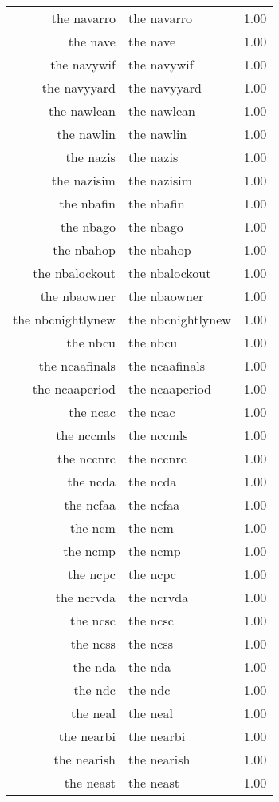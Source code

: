 \begin{table}[ht]
\begin{tabular}{rlr}
  the navarro & the navarro & 1.00 \\ 
  the nave & the nave & 1.00 \\ 
  the navywif & the navywif & 1.00 \\ 
  the navyyard & the navyyard & 1.00 \\ 
  the nawlean & the nawlean & 1.00 \\ 
  the nawlin & the nawlin & 1.00 \\ 
  the nazis & the nazis & 1.00 \\ 
  the nazisim & the nazisim & 1.00 \\ 
  the nbafin & the nbafin & 1.00 \\ 
  the nbago & the nbago & 1.00 \\ 
  the nbahop & the nbahop & 1.00 \\ 
  the nbalockout & the nbalockout & 1.00 \\ 
  the nbaowner & the nbaowner & 1.00 \\ 
  the nbcnightlynew & the nbcnightlynew & 1.00 \\ 
  the nbcu & the nbcu & 1.00 \\ 
  the ncaafinals & the ncaafinals & 1.00 \\ 
  the ncaaperiod & the ncaaperiod & 1.00 \\ 
  the ncac & the ncac & 1.00 \\ 
  the nccmls & the nccmls & 1.00 \\ 
  the nccnrc & the nccnrc & 1.00 \\ 
  the ncda & the ncda & 1.00 \\ 
  the ncfaa & the ncfaa & 1.00 \\ 
  the ncm & the ncm & 1.00 \\ 
  the ncmp & the ncmp & 1.00 \\ 
  the ncpc & the ncpc & 1.00 \\ 
  the ncrvda & the ncrvda & 1.00 \\ 
  the ncsc & the ncsc & 1.00 \\ 
  the ncss & the ncss & 1.00 \\ 
  the nda & the nda & 1.00 \\ 
  the ndc & the ndc & 1.00 \\ 
  the neal & the neal & 1.00 \\ 
  the nearbi & the nearbi & 1.00 \\ 
  the nearish & the nearish & 1.00 \\ 
  the neast & the neast & 1.00 \\ 

\end{tabular}
\end{table}

